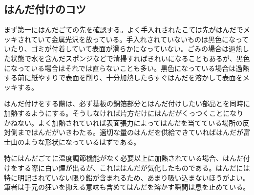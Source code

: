 \documentclass[a4paper,titlepage,here]{ujarticle}
\begin{document}
\subsection{はんだ付けのコツ}
まず第一にはんだごての先を確認する。よく手入れされたこては先がはんだでメッキされていて金属光沢を放っている。手入れされていないものは黒色になっていたり、ゴミが付着していて表面が滑らかになっていない。ごみの場合は過熱した状態で水を含んだスポンジなどで清掃すればきれいになることもあるが、黒色になっている場合はそれでは直らないことも多い。黒色になっている場合は過熱する前に紙やすりで表面を削り、十分加熱したらすぐはんだを溶かして表面をメッキする。

はんだ付けをする際は、必ず基板の銅箔部分とはんだ付けしたい部品とを同時に加熱するようにする。そうしなければ片方だけにはんだがくっつくことになりかねない。よく加熱されていれば表面張力によってはんだを当てている場所の反対側まではんだがいきわたる。適切な量のはんだを供給できていればはんだが富士山のような形状になっているはずである。

特にはんだごてに温度調節機能がなく必要以上に加熱されている場合、はんだ付けをする際に白い煙が出るが、これははんだが気化したものである。はんだには特に明記されていない限り鉛が含まれるため、あまり吸い込まないほうがよい。筆者は手元の狂いを抑える意味も含めてはんだを溶かす瞬間は息を止めている。
\end{document}
